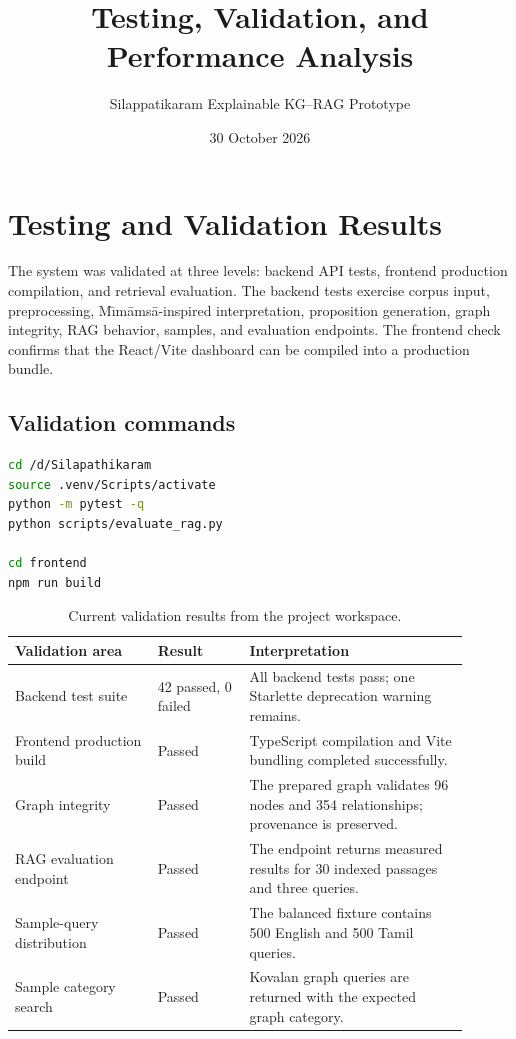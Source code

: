 \documentclass[11pt,a4paper]{article}
\title{Testing, Validation, and Performance Analysis}
\author{Silappatikaram Explainable KG--RAG Prototype}
\date{30 October 2026}
\begin{document}
\maketitle
\vspace{-1em}

\section{Testing and Validation Results}

The system was validated at three levels: backend API tests, frontend production compilation, and retrieval evaluation. The backend tests exercise corpus input, preprocessing, M\={\i}m\={a}ms\={a}-inspired interpretation, proposition generation, graph integrity, RAG behavior, samples, and evaluation endpoints. The frontend check confirms that the React/Vite dashboard can be compiled into a production bundle.

\subsection{Validation commands}

\begin{lstlisting}[language=bash]
cd /d/Silapathikaram
source .venv/Scripts/activate
python -m pytest -q
python scripts/evaluate_rag.py

cd frontend
npm run build
\end{lstlisting}

\begin{table}[ht]
\centering
\caption{Current validation results from the project workspace.}
\label{tab:validation}
\small
\begin{tabular}{p{0.29\linewidth}p{0.18\linewidth}p{0.43\linewidth}}
\toprule
\textbf{Validation area} & \textbf{Result} & \textbf{Interpretation} \\
\midrule
Backend test suite & 42 passed, 0 failed & All backend tests pass; one Starlette deprecation warning remains. \\
Frontend production build & Passed & TypeScript compilation and Vite bundling completed successfully. \\
Graph integrity & Passed & The prepared graph validates 96 nodes and 354 relationships; provenance is preserved. \\
RAG evaluation endpoint & Passed & The endpoint returns measured results for 30 indexed passages and three queries. \\
Sample-query distribution & Passed & The balanced fixture contains 500 English and 500 Tamil queries. \\
Sample category search & Passed & Kovalan graph queries are returned with the expected graph category. \\
\bottomrule
\end{tabular}
\end{table}
\end{document}
